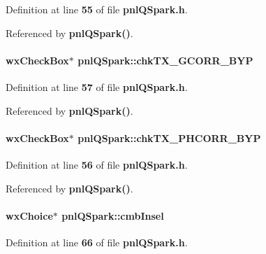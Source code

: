 Definition at line {\bf 55} of file {\bf pnl\+Q\+Spark.\+h}.



Referenced by {\bf pnl\+Q\+Spark()}.

\paragraph[{chk\+T\+X\+\_\+\+G\+C\+O\+R\+R\+\_\+\+B\+YP}]{\setlength{\rightskip}{0pt plus 5cm}wx\+Check\+Box$\ast$ pnl\+Q\+Spark\+::chk\+T\+X\+\_\+\+G\+C\+O\+R\+R\+\_\+\+B\+YP}\label{classpnlQSpark_a69abcafb24174ba2cbe201c7fab108ae}


Definition at line {\bf 57} of file {\bf pnl\+Q\+Spark.\+h}.



Referenced by {\bf pnl\+Q\+Spark()}.

\paragraph[{chk\+T\+X\+\_\+\+P\+H\+C\+O\+R\+R\+\_\+\+B\+YP}]{\setlength{\rightskip}{0pt plus 5cm}wx\+Check\+Box$\ast$ pnl\+Q\+Spark\+::chk\+T\+X\+\_\+\+P\+H\+C\+O\+R\+R\+\_\+\+B\+YP}\label{classpnlQSpark_a8a928fac2ea85401bbe58c1742f9a98b}


Definition at line {\bf 56} of file {\bf pnl\+Q\+Spark.\+h}.



Referenced by {\bf pnl\+Q\+Spark()}.

\paragraph[{cmb\+Insel}]{\setlength{\rightskip}{0pt plus 5cm}wx\+Choice$\ast$ pnl\+Q\+Spark\+::cmb\+Insel}\label{classpnlQSpark_a12a4ba654714150de930c6b6396855bc}


Definition at line {\bf 66} of file {\bf pnl\+Q\+Spark.\+h}.



